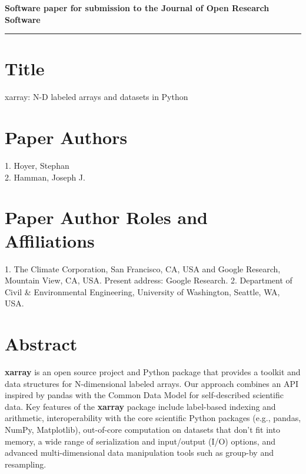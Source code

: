 \documentclass{jors}
\begin{document}
{\bf Software paper for submission to the Journal of Open Research Software} \\

%


\rule{\textwidth}{1pt}

\vspace{0.5cm}

\section*{Title}

xarray: N-D labeled arrays and datasets in Python

\section*{Paper Authors}

{1. Hoyer, Stephan \\
 2. Hamman, Joseph J.}

\section*{Paper Author Roles and Affiliations}
{1. The Climate Corporation, San Francisco, CA, USA and Google Research, Mountain View, CA, USA. Present address: Google Research. 2. Department of Civil \& Environmental Engineering, University of Washington, Seattle, WA, USA.}

\section*{Abstract}

\textbf{xarray} is an open source project and Python package that provides a toolkit and data structures for N-dimensional labeled arrays.
Our approach combines an API inspired by pandas with the Common Data Model for self-described scientific data.
Key features of the \textbf{xarray} package include label-based indexing and arithmetic, interoperability with the core scientific Python packages (e.g., pandas, NumPy, Matplotlib), out-of-core computation on datasets that don't fit into memory, a wide range of serialization and input/output (I/O) options, and advanced multi-dimensional data manipulation tools such as group-by and resampling.
\end{document}
